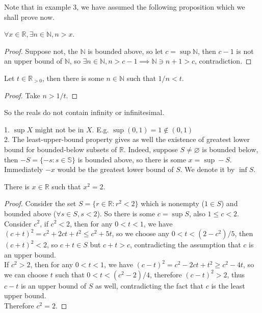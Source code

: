Note that in example 3, we have assumed the following proposition which we shall prove now.
\begin{proposition}
    $\forall x\in\mathbb R,\exists n\in\mathbb N,n>x$.
\end{proposition}
\begin{proof}
    Suppose not, the $\mathbb N$ is bounded above, so let $c=\sup\mathbb N$, then $c-1$ is not an upper bound of $\mathbb N$, so $\exists n\in\mathbb N, n>c-1\implies\mathbb N\ni n+1>c$, contradiction.
\end{proof}
\begin{corollary}
    Let $t\in\mathbb R_{>0}$, then there is some $n\in\mathbb N$ such that $1/n<t$.
\end{corollary}
\begin{proof}
    Take $n>1/t$.
\end{proof}
So the reals do not contain infinity or infinitesimal.
\begin{remark}
    1. $\sup X$ might not be in $X$.
    E.g. $\sup(0,1)=1\notin(0,1)$\\
    2. The least-upper-bound property gives as well the existence of greatest lower bound for bounded-below subsets of $\mathbb R$.
    Indeed, suppose $S\neq\varnothing$ is bounded below, then $-S=\{-s:s\in\mathbb S\}$ is bounded above, so there is some $x=\sup-S$.
    Immediately $-x$ would be the greatest lower bound of $S$.
    We denote it by $\inf S$.
\end{remark}
\begin{theorem}
    There is $x\in\mathbb R$ such that $x^2=2$.
\end{theorem}
\begin{proof}
    Consider the set $S=\{r\in\mathbb R:r^2<2\}$ which is nonempty ($1\in S$) and bounded above ($\forall s\in S,s<2$).
    So there is some $c=\sup S$, also $1\le c<2$.\\
    Consider $c^2$, if $c^2<2$, then for any $0<t<1$, we have $(c+t)^2=c^2+2ct+t^2\le c^2+5t$, so we choose any $0<t<(2-c^2)/5$, then $(c+t)^2<2$, so $c+t\in S$ but $c+t>c$, contradicting the assumption that $c$ is an upper bound.\\
    If $c^2>2$, then for any $0<t<1$, we have $(c-t)^2=c^2-2ct+t^2\ge c^2-4t$, so we can choose $t$ such that $0<t<(c^2-2)/4$, therefore $(c-t)^2>2$, thus $c-t$ is an upper bound of $S$ as well, contradicting the fact that $c$ is the least upper bound.\\
    Therefore $c^2=2$.
\end{proof}
